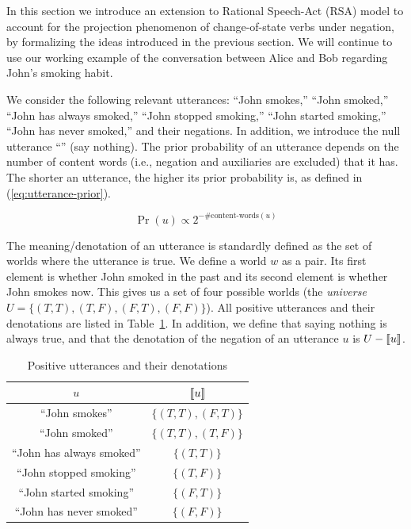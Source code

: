 
In this section we introduce an extension to Rational Speech-Act (RSA) model
\cite{FrankGoodman2012:Predicting-Pragmatic-Reasoning-,GoodmanStuhlmuller2013:Knowledge-and-I} 
to account for the projection phenomenon of change-of-state verbs under negation,
 by formalizing the ideas introduced in the previous section. 
We will continue to use our working example of the conversation between Alice and Bob
 regarding John's smoking habit.

We consider the following relevant utterances: ``John smokes,'' 
 ``John smoked,'' ``John has always smoked,''
 ``John stopped smoking,'' ``John started smoking,'' 
 ``John has never smoked,'' and their negations. 
In addition, we introduce the null utterance ``'' (say nothing).
The prior probability of an utterance depends on the number of content words 
 (i.e., negation and auxiliaries are excluded) that it has.
The shorter an utterance, the higher its prior probability is, as defined in 
 (\ref{eq:utterance-prior}).

\begin{equation}
\Pr(u) \propto 2^{-\#\textrm{content-words}(u)}\label{eq:utterance-prior}
\end{equation}

The meaning/denotation of an utterance is standardly defined as the set of worlds 
 where the utterance is true.
We define a world $w$ as a pair.
Its first element is whether John smoked in the past 
 and its second element is whether John smokes now. 
This gives us a set of four possible worlds (the \emph{universe} 
 $U=\{(T, T), (T, F), (F, T), (F, F)\}$).
All positive utterances and their denotations are listed in Table~\ref{tab:pos-utt-denotations}.
In addition, we define that saying nothing is always true, and that the denotation 
 of the negation of an utterance $u$ is $U-\llbracket \text{$u$} \rrbracket$.

\begin{table}
\centering
\begin{tabular}{cc}
$u$ &  $\llbracket \text{$u$} \rrbracket$  \\ \hline
``John smokes''  & $\{(T, T), (F, T)\}$ \\ 
``John smoked'' & $\{(T, T), (T, F)\}$ \\ 
``John has always smoked'' & $\{(T, T)\}$ \\
``John stopped smoking'' & $\{(T, F)\}$ \\
``John started smoking'' & $\{(F, T)\}$ \\
``John has never smoked'' & $\{(F, F)\}$ 
\end{tabular}
\caption{Positive utterances and their denotations \label{tab:pos-utt-denotations}}
\end{table}


